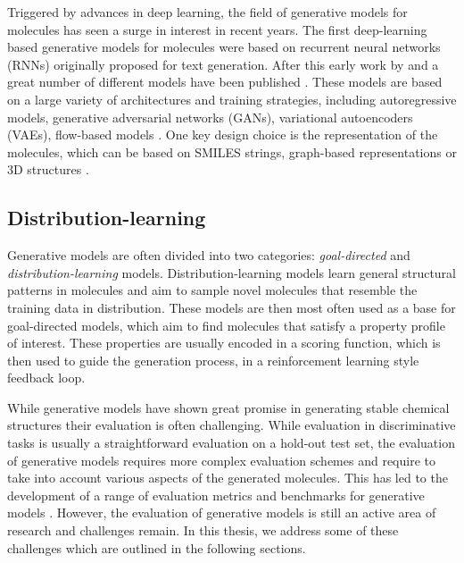 Triggered by advances in deep learning, the field of generative models for
molecules has seen a surge in interest in recent years. The first deep-learning
based generative models for molecules were based on recurrent neural networks
(RNNs) originally proposed for text generation. After this early work by
\citep{seglerGeneratingFocusedMolecule2018} and
\citep{gomez-bombarelliAutomaticChemicalDesign2018} a great number of different
models have been published
\citep{eltonDeepLearningMolecular2019,sanchez-lengelingInverseMolecularDesign2018}.
These models are based on a large variety of architectures and training
strategies, including autoregressive models, generative adversarial networks
(GANs), variational autoencoders (VAEs), flow-based models
\citep{madhawaGraphNVPInvertibleFlow2019}. One key design choice is the
representation of the molecules, which can be based on SMILES strings,
graph-based representations or 3D structures
\citep{eltonDeepLearningMolecular2019,sanchez-lengelingInverseMolecularDesign2018,pangDeepGenerativeModels2024}.

\subsection{Distribution-learning}
Generative models are often divided into two categories: \emph{goal-directed}
and \emph{distribution-learning} models. Distribution-learning models learn
general structural patterns in molecules and aim to sample novel molecules that
resemble the training data in distribution. These models are then most often
used as a base for goal-directed models, which aim to find molecules that
satisfy a property profile of interest. These properties are usually encoded in
a scoring function, which is then used to guide the generation process, in a
reinforcement learning style feedback loop.

While generative models have shown great promise in generating stable chemical
structures their evaluation is often challenging. While evaluation in
discriminative tasks is usually a straightforward evaluation on a hold-out test
set, the evaluation of generative models requires more complex evaluation
schemes and require to take into account various aspects of the generated
molecules. This has led to the development of a range of evaluation metrics
\citep{preuerFrechetChemNetDistance2018,gaoSynthesizabilityMoleculesProposed2020}
and benchmarks for generative models
\citep{polykovskiyMolecularSetsMOSES2020,brownGuacaMolBenchmarkingModels2019}.
However, the evaluation of generative models is still an active area of research
and challenges remain. In this thesis, we address some of these challenges which
are outlined in the following sections.


